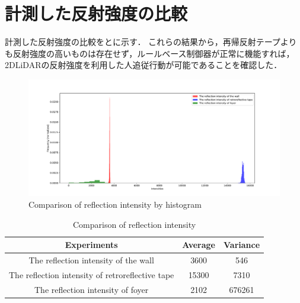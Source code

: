 \section{計測した反射強度の比較}

  計測した反射強度の比較をとに示す．
  これらの結果から，再帰反射テープよりも反射強度の高いものは存在せず，ルールベース制御器が正常に機能すれば，2DLiDARの反射強度を利用した人追従行動が可能であることを確認した．

  \vspace{0.5cm}

  \begin{figure}[h]
    \centering
    \includegraphics[width=14.5cm] {images/pdf/RobotGuidance_plot_reflection_intensities_of_all}
    \captionsetup{justification=raggedright} %
    \caption{Comparison of reflection intensity by histogram}
    \label{Fig:Comparison of reflection intensity by histogram}
  \end{figure}

  \vspace{0.5cm}

  \begin{table}[h]
    \caption{Comparison of reflection intensity}
    \label{tab:Comparison of reflection intensity}
    \centering
    \begin{tabular}{ccc}
    \hline
    Experiments                                      & Average & Variance \\
    \hline
    The reflection intensity of the wall             & 3600    & 546      \\
    The reflection intensity of retroreflective tape & 15300   & 7310     \\
    The reflection intensity of foyer                & 2102    & 676261  \\
    \hline
    \end{tabular}
  \end{table}

\newpage
